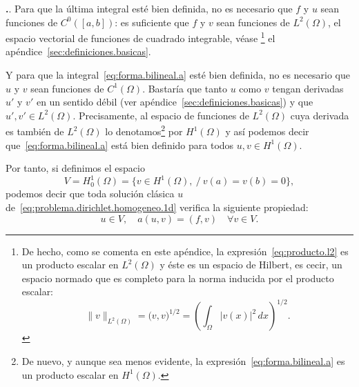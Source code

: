 \documentclass[11pt]{article}
\theoremstyle{plain}
\theoremstyle{definition}
\newcounter{stepnum}[section]
\newcommand{\step}{\bigskip\noindent\textbf{\thesection.\refstepcounter{stepnum}\thestepnum}.\enspace}
\newcommand{\norm}[2][]{\ensuremath{\|#2\|_{#1}}}
\begin{document}
\step
Para que la última integral esté bien definida, no es necesario que $f$ y $u$ sean funciones de $C^0([a,b])$: es suficiente que $f$ y $v$ sean funciones de $L^2(\Omega)$, el espacio vectorial de funciones de cuadrado integrable, véase%
\footnote{De hecho, como se comenta en este apéndice, la expresión~\eqref{eq:producto.l2} es un producto escalar en $L^2(\Omega)$ y éste es un espacio de Hilbert, es cecir, un espacio normado que es completo  para la norma inducida por el producto escalar:
\[
  \norm[L^2(\Omega)]{v} = 
  \big(
   v, v
  \big)^{1/2} =
  \left(
  \int_\Omega |v(x)|^2 \, dx
  \right)^{1/2}.
\]
}
el apéndice~\ref{sec:definiciones.basicas}.

Y para que la integral~\eqref{eq:forma.bilineal.a} esté bien definida, no es necesario que $u$ y $v$ sean funciones de $C^1(\Omega)$. Bastaría que tanto $u$ como $v$ tengan derivadas $u'$ y $v'$ en un sentido débil (ver apéndice~\ref{sec:definiciones.basicas}) y que $u',v'\in L^2(\Omega)$. Precisamente, al espacio de funciones de $L^2(\Omega)$ cuya derivada es también de $L^2(\Omega)$ lo denotamos\footnote{
  De nuevo, y aunque sea menos evidente, la expresión~\eqref{eq:forma.bilineal.a} es un producto escalar en $H^1(\Omega)$.
} por $H^1(\Omega)$ y así podemos decir que~\eqref{eq:forma.bilineal.a} está bien definido para todos $u,v\in H^1(\Omega)$.



%
%   
%
%
Por tanto, si definimos el espacio
\begin{equation*}
  V= H_0^1(\Omega) = \{v\in H^1(\Omega), \ /\ v(a)=v(b)=0\},
\end{equation*}
podemos decir que toda solución clásica $u$ de~\eqref{eq:problema.dirichlet.homogeneo.1d} verifica la siguiente propiedad:
\begin{equation}
u \in V, \quad a(u,v) = (f,v) \quad \forall v\in V.
  \label{eq:formulacon.variacional.1d}
\end{equation}


\appendix
\end{document}
